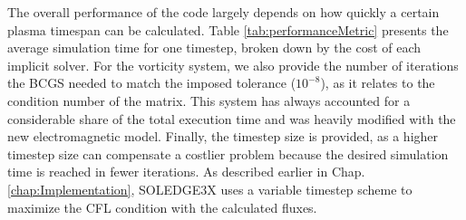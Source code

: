The overall performance of the code largely depends on how quickly a certain plasma timespan can be calculated. Table \ref{tab:performanceMetric} presents the average simulation time for one timestep, broken down by the cost of each implicit solver. For the vorticity system, we also provide the number of iterations the BCGS needed to match the imposed tolerance ($10^{-8}$), as it relates to the condition number of the matrix. This system has always accounted for a considerable share of the total execution time and was heavily modified with the new electromagnetic model. Finally, the timestep size is provided, as a higher timestep size can compensate a costlier problem because the desired simulation time is reached in fewer iterations. As described earlier in Chap. \ref{chap:Implementation}, SOLEDGE3X uses a variable timestep scheme to maximize the CFL condition with the calculated fluxes. \newline

\begin{table}[h!]
	\centering
	\caption[Numerical metrics for the four models for one timestep in TCV]{Numerical metrics for the four models for one timestep in TCV. All quantities are averaged over the last 20000 timesteps of the simulation. The execution time refers to the wall-clock time and must be multiplied by the number of used processors (768) to get the actual used CPU time.}
	\label{tab:performanceMetric}
\end{table}

